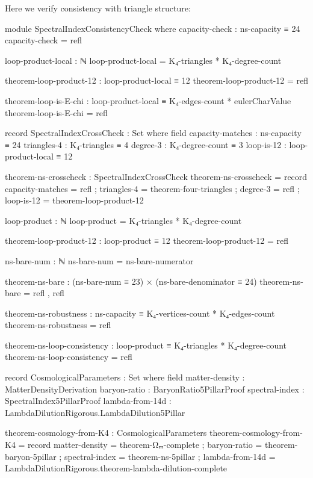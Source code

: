 \documentclass[11pt,a4paper]{book}
\begin{document}
Here we verify consistency with triangle structure:

\begin{code}
module SpectralIndexConsistencyCheck where
  capacity-check : ns-capacity ≡ 24
  capacity-check = refl
  
  loop-product-local : ℕ
  loop-product-local = K₄-triangles * K₄-degree-count
  
  theorem-loop-product-12 : loop-product-local ≡ 12
  theorem-loop-product-12 = refl
  
  theorem-loop-is-E-chi : loop-product-local ≡ K₄-edges-count * eulerCharValue
  theorem-loop-is-E-chi = refl
  
  record SpectralIndexCrossCheck : Set where
    field
      capacity-matches : ns-capacity ≡ 24
      triangles-4      : K₄-triangles ≡ 4
      degree-3         : K₄-degree-count ≡ 3
      loop-is-12       : loop-product-local ≡ 12
  
  theorem-ns-crosscheck : SpectralIndexCrossCheck
  theorem-ns-crosscheck = record
    { capacity-matches = refl
    ; triangles-4      = theorem-four-triangles
    ; degree-3         = refl
    ; loop-is-12       = theorem-loop-product-12
    }

loop-product : ℕ
loop-product = K₄-triangles * K₄-degree-count

theorem-loop-product-12 : loop-product ≡ 12
theorem-loop-product-12 = refl

ns-bare-num : ℕ
ns-bare-num = ns-bare-numerator

theorem-ns-bare : (ns-bare-num ≡ 23) × (ns-bare-denominator ≡ 24)
theorem-ns-bare = refl , refl
\end{code}

\begin{code}
theorem-ns-robustness : ns-capacity ≡ K₄-vertices-count * K₄-edges-count
theorem-ns-robustness = refl

theorem-ns-loop-consistency : loop-product ≡ K₄-triangles * K₄-degree-count
theorem-ns-loop-consistency = refl

record CosmologicalParameters : Set where
  field
    matter-density    : MatterDensityDerivation
    baryon-ratio      : BaryonRatio5PillarProof
    spectral-index    : SpectralIndex5PillarProof
    lambda-from-14d   : LambdaDilutionRigorous.LambdaDilution5Pillar
\end{code}

\begin{code}
theorem-cosmology-from-K4 : CosmologicalParameters
theorem-cosmology-from-K4 = record
  { matter-density  = theorem-Ωₘ-complete
  ; baryon-ratio    = theorem-baryon-5pillar
  ; spectral-index  = theorem-ns-5pillar
  ; lambda-from-14d = LambdaDilutionRigorous.theorem-lambda-dilution-complete
  }
\end{code}
\end{document}
